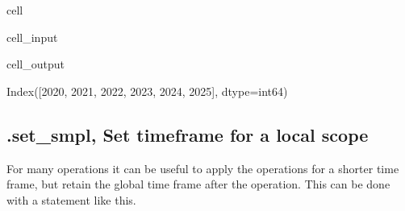 \documentclass[letterpaper,10pt,english]{jupyterBook}
\begin{document}
\begin{sphinxuseclass}{cell}\begin{sphinxVerbatimInput}

\begin{sphinxuseclass}{cell_input}
\begin{sphinxVerbatim}[commandchars=\\\{\}]
\end{sphinxVerbatim}

\end{sphinxuseclass}\end{sphinxVerbatimInput}
\begin{sphinxVerbatimOutput}

\begin{sphinxuseclass}{cell_output}
\begin{sphinxVerbatim}[commandchars=\\\{\}]
Index([2020, 2021, 2022, 2023, 2024, 2025], dtype=\PYGZsq{}int64\PYGZsq{})
\end{sphinxVerbatim}

\end{sphinxuseclass}\end{sphinxVerbatimOutput}

\end{sphinxuseclass}

\subsection{.set\_smpl, Set timeframe for a local scope}
\label{\detokenize{content/notebooks/modelflow_features:set-smpl-set-timeframe-for-a-local-scope}}
\sphinxAtStartPar
For many operations it can be useful to apply the operations for a shorter time frame, but retain the global time frame after the operation. 
This can be done  with a  statement like this.
\end{document}
